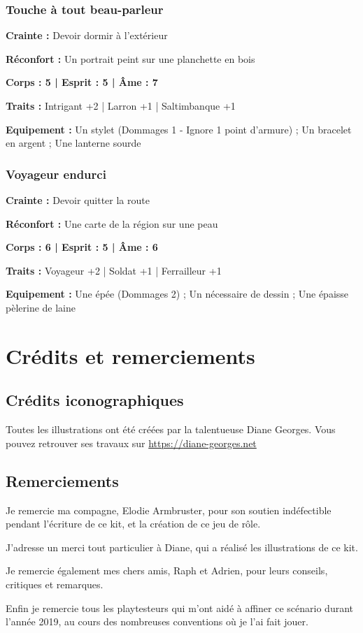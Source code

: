 \documentclass[10pt,twoside,twocolumn,openany,bg=print,justified]{dndbook}
\begin{document}
\subsection*{Touche à tout beau-parleur}

\textbf{Crainte :} Devoir dormir à l'extérieur

\textbf{Réconfort :} Un portrait peint sur une planchette en bois

\textbf{Corps : 5 | Esprit : 5 | Âme : 7}

\textbf{Traits :} Intrigant +2 | Larron +1 | Saltimbanque +1

\textbf{Equipement :} Un stylet (Dommages 1 - Ignore 1 point d'armure) ; Un bracelet en argent ; Une lanterne sourde

\subsection*{Voyageur endurci}

\textbf{Crainte :} Devoir quitter la route

\textbf{Réconfort :} Une carte de la région sur une peau

\textbf{Corps : 6 | Esprit : 5 | Âme : 6}

\textbf{Traits :} Voyageur +2 | Soldat +1 | Ferrailleur +1

\textbf{Equipement :} Une épée (Dommages 2) ; Un nécessaire de dessin ; Une épaisse pèlerine de laine

\chapter{Crédits et remerciements}

\section*{Crédits iconographiques}

Toutes les illustrations ont été créées par la talentueuse Diane Georges. Vous pouvez retrouver ses travaux sur \url{https://diane-georges.net}

\section*{Remerciements}

Je remercie ma compagne, Elodie Armbruster, pour son soutien indéfectible pendant l'écriture de ce kit, et la création de ce jeu de rôle.

J'adresse un merci tout particulier à Diane, qui a réalisé les illustrations de ce kit.

Je remercie également mes chers amis, Raph et Adrien, pour leurs conseils, critiques et remarques.

Enfin je remercie tous les playtesteurs qui m'ont aidé à affiner ce scénario durant l'année 2019, au cours des nombreuses conventions où je l'ai fait jouer.
\end{document}
